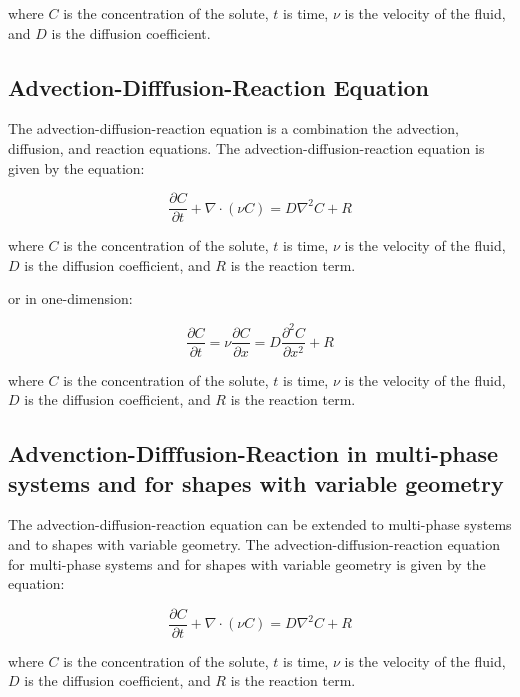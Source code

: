\documentclass{tufte-handout}\usepackage[]{graphicx}\usepackage[]{xcolor}
\begin{document}
where $C$ is the concentration of the solute, $t$ is time, $\nu$ is the velocity of the fluid, and $D$ is the diffusion coefficient.

\subsection{Advection-Difffusion-Reaction Equation}

The advection-diffusion-reaction equation is a combination the advection, diffusion, and reaction equations. The advection-diffusion-reaction equation is given by the equation:

\begin{equation}
\frac{\partial C}{\partial t} + \nabla \cdot (\nu C) = D \nabla^2 C + R
\end{equation}

where $C$ is the concentration of the solute, $t$ is time, $\nu$ is the velocity of the fluid, $D$ is the diffusion coefficient, and $R$ is the reaction term.

or in one-dimension:

\begin{equation}
\frac{\partial C}{\partial t} = \nu \frac{\partial C}{\partial x} = D \frac{\partial^2 C}{\partial x^2} + R
\end{equation}

where $C$ is the concentration of the solute, $t$ is time, $\nu$ is the velocity of the fluid, $D$ is the diffusion coefficient, and $R$ is the reaction term.

  
\subsection{Advenction-Difffusion-Reaction in multi-phase systems and for shapes with variable geometry}

The advection-diffusion-reaction equation can be extended to multi-phase systems and to shapes with variable geometry. The advection-diffusion-reaction equation for multi-phase systems and for shapes with variable geometry is given by the equation:

\begin{equation}
\frac{\partial C}{\partial t} + \nabla \cdot (\nu C) = D \nabla^2 C + R
\end{equation}

where $C$ is the concentration of the solute, $t$ is time, $\nu$ is the velocity of the fluid, $D$ is the diffusion coefficient, and $R$ is the reaction term.
  
\end{document}
